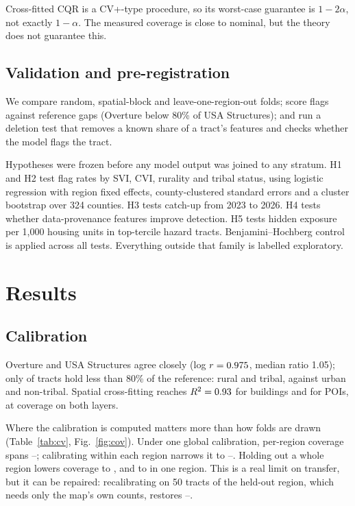 \documentclass[conference]{IEEEtran}
\begin{document}
Cross-fitted CQR is a CV+-type procedure, so its worst-case guarantee is $1-2\alpha$, not exactly $1-\alpha$. The measured coverage is close to nominal, but the theory does not guarantee this.

\subsection{Validation and pre-registration}
We compare random, spatial-block and leave-one-region-out folds; score flags against reference gaps (Overture below 80\% of USA Structures); and run a deletion test that removes a known share of a tract's features and checks whether the model flags the tract.

Hypotheses were frozen before any model output was joined to any stratum. H1 and H2 test flag rates by SVI, CVI, rurality and tribal status, using logistic regression with region fixed effects, county-clustered standard errors and a cluster bootstrap over 324 counties. H3 tests catch-up from 2023 to 2026. H4 tests whether data-provenance features improve detection. H5 tests hidden exposure per 1,000 housing units in top-tercile hazard tracts. Benjamini--Hochberg control \cite{bh1995} is applied across all \NFdrFamily{} tests. Everything outside that family is labelled exploratory.

\section{Results}
\subsection{Calibration}
Overture and USA Structures agree closely (log $r=0.975{}$, median ratio 1.05); only \RefGapShare{} of tracts hold less than 80\% of the reference: \RefGapRural{} rural and \RefGapTribal{} tribal, against \RefGapUrban{} urban and \RefGapNonTribal{} non-tribal. Spatial cross-fitting reaches $R^2=0.93{}$ for buildings and \RTwoPoi{} for POIs, at \CovBldg{} coverage on both layers.

Where the calibration is computed matters more than how folds are drawn (Table~\ref{tab:cv}, Fig.~\ref{fig:cov}). Under one global calibration, per-region coverage spans \CovSpatRegMinBldg{}--\CovSpatRegMaxBldg{}; calibrating within each region narrows it to \CovMondRegMinBldg{}--\CovMondRegMaxBldg{}. Holding out a whole region lowers coverage to \CovLoroBldg{}, and to \CovLoroMinBldg{} in one region. This is a real limit on transfer, but it can be repaired: recalibrating on 50 tracts of the held-out region, which needs only the map's own counts, restores \JtFiftyMin{}--\JtFiftyMax{}.
\end{document}
